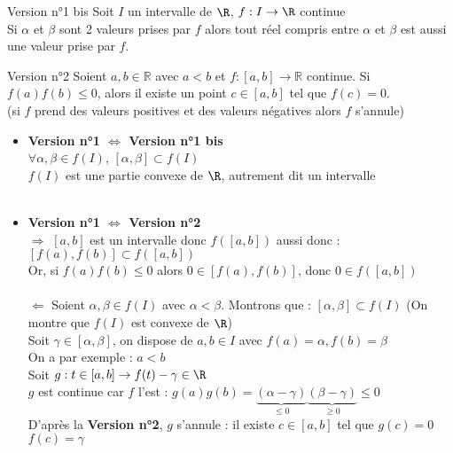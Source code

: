 \documentclass[12pt,a4paper]{report}
\begin{document}
\begin{theoreme}{Version n°1 bis}{}
Soit $I$ un intervalle de $\R$, $f:I \rightarrow \R$ continue \\
Si $\alpha$ et $\beta$ sont 2 valeurs prises par $f$ alors tout réel compris entre $\alpha$ et $\beta$ est aussi une valeur prise par $f$.
\end{theoreme}

\begin{theoreme}{Version n°2}{}
Soient $a,b\in\mathbb{R}$ avec $a<b$ et $f:\left[a,b\right]\longrightarrow\mathbb{R}$
continue. Si $f(a)f(b)\leqslant0$, alors il existe un point $c \in [a,b]$ tel que $f(c)=0$.\\
(si $f$ prend des valeurs positives et des valeurs négatives alors $f$ s'annule)
\end{theoreme}

\begin{demo}
\begin{itemize}
    \item \textbf{Version n°1 $\Longleftrightarrow$ Version n°1 bis } \\
    $\forall \alpha, \beta \in f(I)$, $[\alpha, \beta] \subset f(I)$ \\
    \ie $f(I)$ est une partie convexe de $\R$, autrement dit un intervalle \\
    \\
    \item \textbf{Version n°1 $\Longleftrightarrow$ Version n°2 } \\
    $\Longrightarrow$ $[a,b]$ est un intervalle donc $f([a,b])$ aussi donc : $[f(a),f(b)]\subset f([a,b])$\\
    Or, si $f(a)f(b) \leq 0$ alors $0\in [f(a), f(b)]$, donc $0\in f([a,b])$\\
    \\
    $\Longleftarrow$ Soient $\alpha, \beta \in f(I)$ avec $\alpha < \beta$. Montrons que : $[\alpha, \beta] \subset f(I)$ (On montre que $f(I)$ est convexe de $\R$)\\
    Soit $\gamma \in [\alpha, \beta]$, on dispose de $a,b \in I$ avec $f(a)=\alpha , f(b)=\beta$\\
    On a par exemple : $a<b$\\
    Soit $g:t \in [a,b] \rightarrow f(t) - \gamma \in \R$ \\
    $g$ est continue car $f$ l'est : $g(a)g(b)= \underbrace{(\alpha - \gamma)}_{\leq 0} \underbrace{(\beta - \gamma)}_{\geq 0} \leq 0$\\
    D'après la \textbf{Version n°2}, $g$ s'annule : il existe $c\in [a,b]$ tel que $g(c)=0$ \ie $f(c)=\gamma$
    
\end{itemize}
\end{demo}
\end{document}
